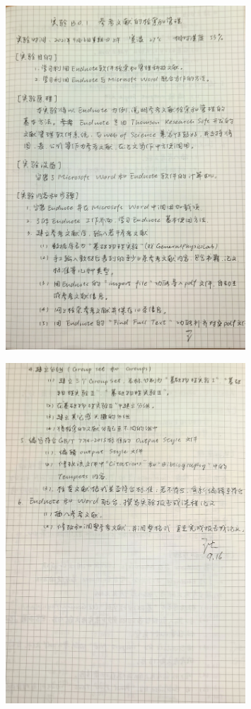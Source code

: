 \documentclass[12pt,a4paper,UTF8]{ctexart}
\begin{document}
	\begin{figure}[htbp]
		\centering
		\includegraphics[width=0.8\textwidth]{img//preview1.jpg}
	\end{figure}
	\begin{figure}[htbp]

		\centering
		\includegraphics[width=0.8\textwidth]{img//preview2.jpg}
	\end{figure}
\end{document}
